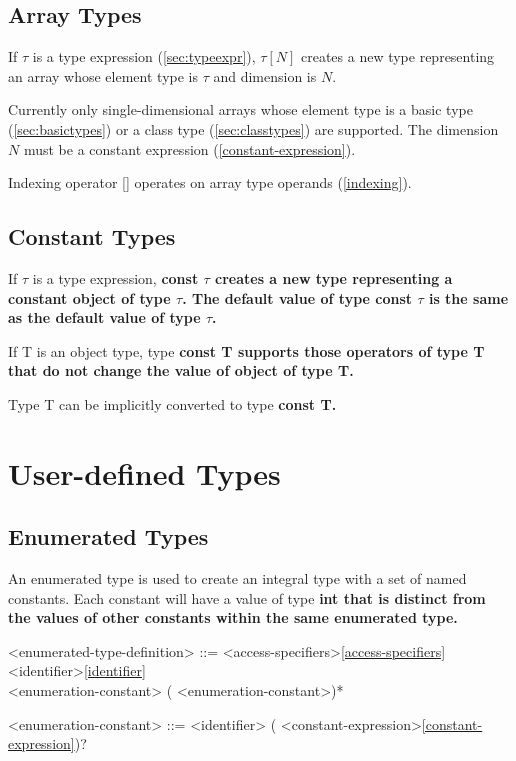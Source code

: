 \documentclass[a4paper,oneside,11pt]{article}
\begin{document}
\subsection{Array Types}\label{sec:arraytypes}

If $\tau$ is a type expression (\ref{sec:typeexpr}), $\tau[N]$ creates a new type representing an array whose element type is $\tau$ and dimension is $N$.

Currently only single-dimensional arrays whose element type is a basic type (\ref{sec:basictypes}) or
a class type (\ref{sec:classtypes}) are supported.
The dimension $N$ must be a constant expression (\ref{constant-expression}).

Indexing operator [] operates on array type operands (\ref{indexing}).

\subsection{Constant Types}

If $\tau$ is a type expression, \bf{const} $\tau$ creates a new type representing a constant object of type $\tau$.
The default value of type \bf{const} $\tau$ is the same as the default value of type $\tau$.

If T is an object type, type \bf{const} T supports those operators of type T that do not change the value of object of type T.

Type T can be implicitly converted to type \bf{const} T.

\section{User-defined Types}

\subsection{Enumerated Types}\label{sec:enumerations}

An enumerated type is used to create an integral type with a set of named constants.
Each constant will have a value of type \bf{int} that is distinct
from the values of other constants within the same enumerated type.

\begin{grammar}
\label{enumerated-type-definition}<enumerated-type-definition> ::= <access-specifiers>\ref{access-specifiers}  <identifier>\ref{identifier}\\
                      \lit{(} <enumeration-constant> (\lit*{,} <enumeration-constant>)* \lit{)}

<enumeration-constant> ::= <identifier> (\lit*{=} <constant-expression>\ref{constant-expression})?
\end{grammar}
\end{document}
